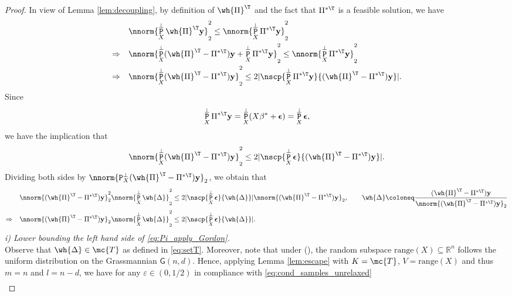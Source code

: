 \documentclass[11pt]{article}
\def\R{\mathbb{R}}
\DeclareMathOperator{\pr}{\texttt{P}}
\def\y{\mathbf{y}}
\def\eps{\boldsymbol{\epsilon}}
\def\epss{\varepsilon}
\begin{document}
\begin{proof} In view of Lemma \ref{lem:decoupling}, by definition of $\wh{\Pi}^{\T}$ and the fact that $\Pi^{*\T}$ is a feasible solution, we have
 \begin{align*} 
&\nnorm{\pr_X^{\perp}\wh{\Pi}^{\T} \y}_2^2  \leq  \nnorm{\pr_X^{\perp}\Pi^{*\T} \y}_2^2 \\
  \Rightarrow \quad & \nnorm{\pr_X^{\perp}(\wh{\Pi}^{\T}  - \Pi^{*\T}) \y + \pr_X^{\perp}\Pi^{*\T} \y }_2^2 \leq \nnorm{\pr_X^{\perp}\Pi^{*\T} \y}_2^2 \\
  \Rightarrow \quad  & \nnorm{\pr_X^{\perp}(\wh{\Pi}^{\T}  - \Pi^{*\T}) \y}_2^2 \leq 2 |\nscp{\pr_X^{\perp}\Pi^{*\T} \y}{(\wh{\Pi}^{\T}  - \Pi^{*\T}) \y}|. 
 \end{align*}
Since
\begin{equation*}
\pr_X^{\perp} \Pi^{*\T} \y = \pr_X^{\perp} (X \beta^* + \eps) = \pr_X^{\perp}\eps,
\end{equation*}
we have the implication that
\begin{equation*}
  \nnorm{\pr_X^{\perp}(\wh{\Pi}^{\T}  - \Pi^{*\T}) \y}_2^2 \leq 2 |\nscp{\pr_X^{\perp}\eps}{(\wh{\Pi}^{\T}  - \Pi^{*\T}) \y}|.
\end{equation*}
Dividing both sides by $\nnorm{\pr_X^{\perp}(\wh{\Pi}^{\T}  - \Pi^{*\T}) \y}_2$, we obtain that
\begin{align}
  &\nnorm{(\wh{\Pi}^{\T}  - \Pi^{*\T}) \y}_2^2 \nnorm{\pr_X^{\perp} \wh{\Delta}}_2^2 \leq 2 |\nscp{\pr_X^{\perp}\eps}{\wh{\Delta}}| \nnorm{(\wh{\Pi}^{\T}  - \Pi^{*\T}) \y}_2, \qquad \wh{\Delta} \coloneq
  \frac{(\wh{\Pi}^{\T}  - \Pi^{*\T}) \y}{\nnorm{(\wh{\Pi}^{\T}  - \Pi^{*\T}) \y}_2} \notag \\
\Rightarrow \quad &\nnorm{(\wh{\Pi}^{\T}  - \Pi^{*\T}) \y}_2  \nnorm{\pr_X^{\perp}\wh{\Delta}}_2^2  \leq 2 |\nscp{\pr_X^{\perp}\eps}{\wh{\Delta}}| \label{eq:Pi_apply_Gordon}.  
\end{align}
\emph{i) Lower bounding the left hand side of \eqref{eq:Pi_apply_Gordon}.}\\
Observe that $\wh{\Delta} \in \mc{T}$ as defined in \eqref{eq:setT}. Moreover, note that under (), the random subspace
$\text{range}(X) \subseteq \R^n$ follows the uniform distribution on the Grassmannian $\textsf{G}(n,d)$. Hence, applying Lemma \ref{lem:escape} with $K = \mc{T}$,
$V = \text{range}(X)$ and thus $m = n$ and $l = n-d$, we have for any $\epss \in (0,1/2)$ in compliance with \eqref{eq:cond_samples_unrelaxed}    
\begin{align}\label{eq:lowerbound}

\end{align}
\end{proof}
\end{document}
